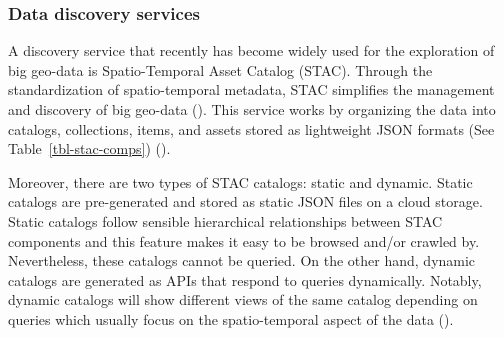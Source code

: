\documentclass[
  oneside,
  open=any]{scrbook}
\begin{document}
\subsubsection*{Data discovery services}\label{data-discovery-services}

A discovery service that recently has become widely used for the
exploration of big geo-data is Spatio-Temporal Asset Catalog (STAC).
Through the standardization of spatio-temporal metadata, STAC simplifies
the management and discovery of big geo-data
(). This
service works by organizing the data into catalogs, collections, items,
and assets stored as lightweight JSON formats (See
Table~\ref{tbl-stac-comps}) ().

Moreover, there are two types of STAC catalogs: static and dynamic.
Static catalogs are pre-generated and stored as static JSON files on a
cloud storage. Static catalogs follow sensible hierarchical
relationships between STAC components and this feature makes it easy to
be browsed and/or crawled by. Nevertheless, these catalogs cannot be
queried. On the other hand, dynamic catalogs are generated as APIs that
respond to queries dynamically. Notably, dynamic catalogs will show
different views of the same catalog depending on queries which usually
focus on the spatio-temporal aspect of the data
().
\end{document}
